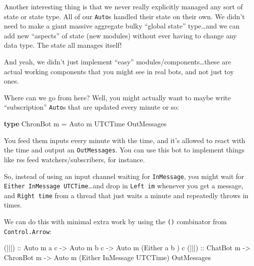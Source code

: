 \documentclass[]{article}
\newenvironment{Shaded}{}{}
\newcommand{\DataTypeTok}[1]{\textcolor[rgb]{0.56,0.13,0.00}{#1}}
\newcommand{\KeywordTok}[1]{\textcolor[rgb]{0.00,0.44,0.13}{\textbf{#1}}}
\newcommand{\NormalTok}[1]{#1}
\newcommand{\OtherTok}[1]{\textcolor[rgb]{0.00,0.44,0.13}{#1}}
\begin{document}
Another interesting thing is that we never really explicitly managed any sort of
state or state type. All of our \texttt{Auto}s handled their state on their own.
We didn't need to make a giant massive aggregate bulky ``global state''
type\ldots and we can add new ``aspects'' of state (new modules) without ever
having to change any data type. The state all manages itself!

And yeah, we didn't just implement ``easy'' modules/components\ldots these are
actual working components that you might see in real bots, and not just toy
ones.

Where can we go from here? Well, you might actually want to maybe write
``subscription'' \texttt{Auto}s that are updated every minute or so:

\begin{Shaded}
\begin{Highlighting}[]
\KeywordTok{type} \DataTypeTok{ChronBot}\NormalTok{ m }\OtherTok{=} \DataTypeTok{Auto}\NormalTok{ m }\DataTypeTok{UTCTime} \DataTypeTok{OutMessages}
\end{Highlighting}
\end{Shaded}

You feed them inputs every minute with the time, and it's allowed to react with
the time and output an \texttt{OutMessages}. You can use this bot to implement
things like rss feed watchers/subscribers, for instance.

So, instead of using an input channel waiting for \texttt{InMessage}, you might
wait for \texttt{Either\ InMessage\ UTCTime}\ldots and drop in \texttt{Left\ im}
whenever you get a message, and \texttt{Right\ time} from a thread that just
waits a minute and repeatedly throws in times.

We can do this with minimal extra work by using the
\texttt{(\textbar{}\textbar{}\textbar{})} combinator from
\texttt{Control.Arrow}:

\begin{Shaded}
\begin{Highlighting}[]
\OtherTok{(|||) ::} \DataTypeTok{Auto}\NormalTok{ m a c }\OtherTok{{-}>} \DataTypeTok{Auto}\NormalTok{ m b c }\OtherTok{{-}>} \DataTypeTok{Auto}\NormalTok{ m (}\DataTypeTok{Either}\NormalTok{ a         b      ) c}
\OtherTok{(|||) ::} \DataTypeTok{ChatBot}\NormalTok{ m  }\OtherTok{{-}>} \DataTypeTok{ChronBot}\NormalTok{ m }\OtherTok{{-}>} \DataTypeTok{Auto}\NormalTok{ m (}\DataTypeTok{Either} \DataTypeTok{InMessage} \DataTypeTok{UTCTime}\NormalTok{) }\DataTypeTok{OutMessages}
\end{Highlighting}
\end{Shaded}
\end{document}
